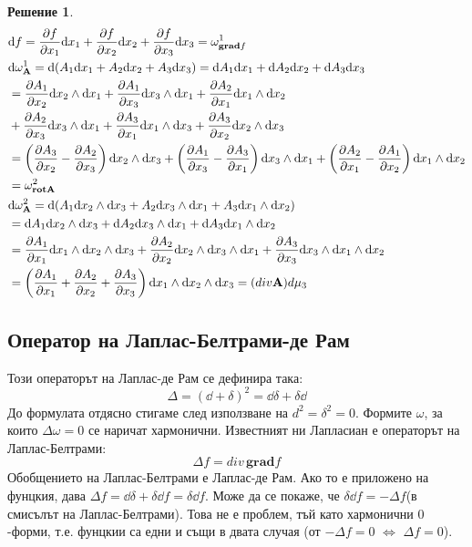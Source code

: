\documentclass[12pt]{article}
\newtheorem*{solution*}{Решение}
\begin{document}
\begin{large}
\begin{solution*}
\begin{align*}
  &\dd f = \pdv{f}{x_1} \dd x_1 + \pdv{f}{x_2} \dd x_2 + \pdv{f}{x_3} \dd x_3 = \omega_{\mathbf{grad}f}^1 \\
  &\dd \omega_{\mathbf{A}}^1 = \dd (A_1 \dd x_1 + A_2 \dd x_2 + A_3 \dd x_3) = \dd A_1 \dd x_1 + \dd A_2 \dd x_2 + \dd A_3 \dd x_3 \\
  &=\pdv{A_1}{x_2} \dd x_2 \wedge \dd x_1 + \pdv{A_1}{x_3} \dd x_3 \wedge \dd x_1 + \pdv{A_2}{x_1} \dd x_1 \wedge \dd x_2 \\
  &+\pdv{A_2}{x_3} \dd x_3 \wedge \dd x_1 + \pdv{A_3}{x_1} \dd x_1 \wedge \dd x_3 + \pdv{A_3}{x_2} \dd x_2 \wedge \dd x_3 \\
  &= \left(\pdv{A_3}{x_2} - \pdv{A_2}{x_3}\right) \dd x_2 \wedge \dd x_3 + \left(\pdv{A_1}{x_3} - \pdv{A_3}{x_1}\right) \dd x_3 \wedge \dd x_1 + \left(\pdv{A_2}{x_1} - \pdv{A_1}{x_2}\right) \dd x_1 \wedge \dd x_2 \\
  &=\omega_{\mathbf{rot}\mathbf{A}}^2 \\
  &\dd \omega_{\mathbf{A}}^2 = \dd (A_1 \dd x_2 \wedge \dd x_3 + A_2 \dd x_3 \wedge \dd x_1 + A_3 \dd x_1 \wedge \dd x_2) \\
  &= \dd A_1 \dd x_2 \wedge \dd x_3 + \dd A_2 \dd x_3 \wedge \dd x_1 + \dd A_3 \dd x_1 \wedge \dd x_2 \\
  &=\pdv{A_1}{x_1} \dd x_1 \wedge \dd x_2 \wedge \dd x_3 + \pdv{A_2}{x_2} \dd x_2 \wedge \dd x_3 \wedge \dd x_1 + \pdv{A_3}{x_3} \dd x_3 \wedge \dd x_1 \wedge \dd x_2 \\
  &=\left(\pdv{A_1}{x_1}+\pdv{A_2}{x_2}+\pdv{A_3}{x_3}\right)\dd x_1 \wedge \dd x_2 \wedge \dd x_3 = (div \mathbf{A})d\mu_3
\end{align*}
\end{solution*}

\subsection{Оператор на Лаплас-Белтрами-де Рам}
Този операторът на Лаплас-де Рам се дефинира така:
\[
\Delta = (\dd + \delta)^2 = \dd \delta + \delta \dd
\]
До формулата отдясно стигаме след използване на $d^2=\delta^2=0$. Формите $\omega$, за които $\Delta \omega = 0$ се наричат хармонични.
Известният ни Лапласиан е операторът на Лаплас-Белтрами:
\[
\Delta f = div \, \mathbf{grad} f
\]
Обобщението на Лаплас-Белтрами е Лаплас-де Рам. Ако то е приложено на фунцкия, дава $\Delta f = \dd \delta + \delta \dd f = \delta \dd f$. Може да се покаже, че $\delta \dd f=-\Delta f$(в смисълът на Лаплас-Белтрами). Това не е проблем, тъй като хармонични $0$-форми, т.е. фунцкии са едни и същи в двата случая (от $-\Delta f = 0$ $\Longleftrightarrow$ $\Delta f = 0$).


\end{large}
\end{document}

